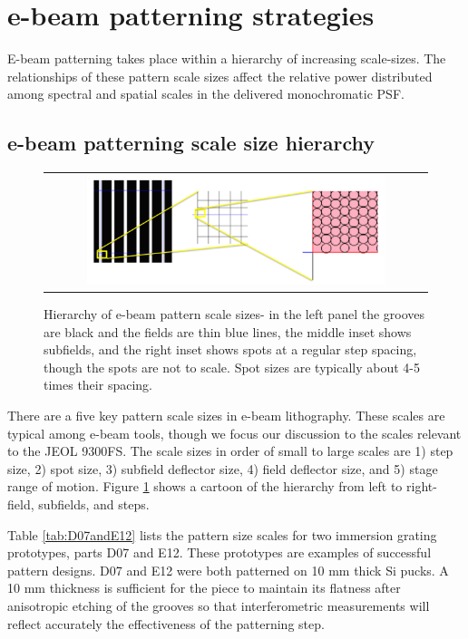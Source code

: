 \documentclass[]{spie}  %
\begin{document}
\section{e-beam patterning strategies}
E-beam patterning takes place within a hierarchy of increasing scale-sizes.  The relationships of these pattern scale sizes affect the relative power distributed among spectral and spatial scales in the delivered monochromatic PSF.

\subsection{e-beam patterning scale size hierarchy}

\begin{figure}
\begin{center}
 \begin{tabular}{c}
    \includegraphics[width=0.8\textwidth]{figs/Field_sizes_cascade_02.png}
   \end{tabular}
  \end{center}
  \caption[e-beam Hierarchy]{\label{fig:Hierarchy} Hierarchy of e-beam pattern scale sizes- in the left panel the grooves are black and the fields are thin blue lines, the middle inset shows subfields, and the right inset shows spots at a regular step spacing, though the spots are not to scale.  Spot sizes are typically about 4-5 times their spacing.}
\end{figure}


There are a five key pattern scale sizes in e-beam lithography.  These scales are typical among e-beam tools, though we focus our discussion to the scales relevant to the JEOL 9300FS.  The scale sizes in order of small to large scales are 1) step size, 2) spot size, 3) subfield deflector size, 4) field deflector size, and 5) stage range of motion.  Figure \ref{fig:Hierarchy} shows a cartoon of the hierarchy from left to right- field, subfields, and steps.

Table \ref{tab:D07andE12} lists the pattern size scales for two immersion grating prototypes, parts D07 and E12.  These prototypes are examples of successful pattern designs.  D07 and E12 were both patterned on 10 mm thick Si pucks.  A 10 mm thickness is sufficient for the piece to maintain its flatness after anisotropic etching of the grooves so that interferometric measurements will reflect accurately the effectiveness of the patterning step.
\end{document}
